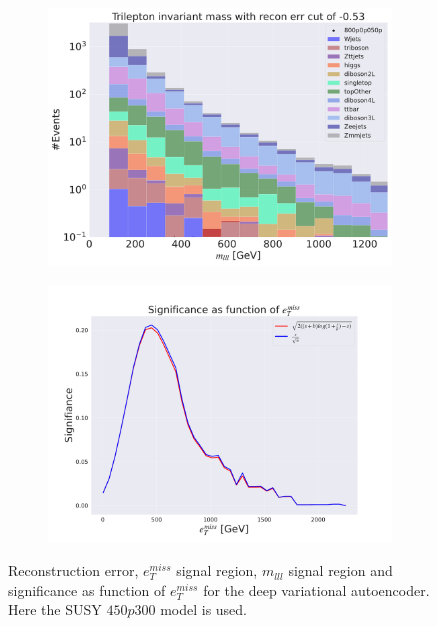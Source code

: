 \begin{figure}[H]
    \hfill
    \begin{subfigure}{.49\textwidth}
        \includegraphics[width=\textwidth]{Figures/VAE_testing/big/3lep/b_data_recon_big_rm3_feats_sig_800p0p050p_mlll_recon_errcut_-0.53.pdf}
        \caption{}
        \label{fig:VAE_3lep_big_mlll_800_3}
    \end{subfigure}
    \hfill   
    \begin{subfigure}{.49\textwidth}
        \includegraphics[width=\textwidth]{Figures/VAE_testing/big/3lep/significance_etmiss_800p0p050p_-0.529426176908041.pdf}
        \caption{}
        \label{fig:VAE_3lep_big_signi_800_3}
    \end{subfigure}
    \hfill      
    \caption[3lep deep network | $800p50$ | VAE | 3]{Reconstruction error, $e_T^{miss}$ signal region, $m_{lll}$ signal region and significance as function of 
    $e_T^{miss}$ for the deep variational autoencoder. Here the SUSY $450p300$ model is used.}
    \label{fig:VAE_3lep_big_rec_sig_signi_800_3}
\end{figure}

